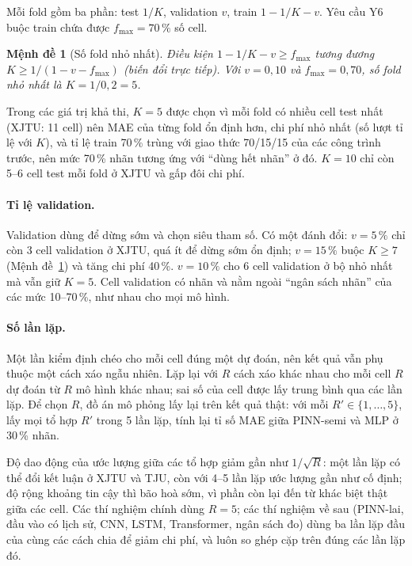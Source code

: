 \documentclass[12pt,a4paper,oneside]{report}
\theoremstyle{plain}
\newtheorem{menhde}{Mệnh đề}[chapter]
\theoremstyle{definition}
\begin{document}
Mỗi fold gồm ba phần: test $1/K$, validation $v$, train $1 - 1/K - v$. Yêu cầu Y6 buộc train chứa được
$f_{\max} = 70\,\%$ số cell.

\begin{menhde}[Số fold nhỏ nhất]\label{md:kmin}
Điều kiện $1 - 1/K - v \ge f_{\max}$ tương đương $K \ge 1/(1 - v - f_{\max})$ (biến đổi trực tiếp). Với $v = 0{,}10$
và $f_{\max} = 0{,}70$, số fold nhỏ nhất là $K = 1/0{,}2 = 5$.
\end{menhde}

Trong các giá trị khả thi, $K = 5$ được chọn vì mỗi fold có nhiều cell test nhất (XJTU: 11 cell) nên MAE của từng
fold ổn định hơn, chi phí nhỏ nhất (số lượt tỉ lệ với $K$), và tỉ lệ train 70\,\% trùng với giao thức 70/15/15 của
các công trình trước, nên mức 70\,\% nhãn tương ứng với “dùng hết nhãn” ở đó. $K = 10$ chỉ còn 5--6 cell test mỗi
fold ở XJTU và gấp đôi chi phí.



\paragraph{Tỉ lệ validation.} Validation dùng để dừng sớm và chọn siêu tham số. Có một đánh đổi: $v = 5\,\%$ chỉ còn 3 cell validation ở XJTU, quá ít để dừng sớm ổn định; $v = 15\,\%$ buộc $K \ge 7$
(Mệnh đề~\ref{md:kmin}) và tăng chi phí 40\,\%. $v = 10\,\%$ cho 6 cell validation ở bộ nhỏ nhất mà vẫn giữ $K = 5$.
Cell validation có nhãn và nằm ngoài “ngân sách nhãn” của các mức 10--70\,\%, như nhau cho mọi mô hình.



\paragraph{Số lần lặp.} Một lần kiểm định chéo cho mỗi cell đúng một dự đoán, nên kết quả vẫn phụ thuộc một cách xáo ngẫu nhiên. Lặp
lại với $R$ cách xáo khác nhau cho mỗi cell $R$ dự đoán từ $R$ mô hình khác nhau; sai số của cell được lấy
trung bình qua các lần lặp. Để chọn $R$, đồ án mô phỏng lấy lại trên kết quả thật: với mỗi $R' \in \{1, \dots, 5\}$,
lấy mọi tổ hợp $R'$ trong 5 lần lặp, tính lại tỉ số MAE giữa PINN-semi và MLP ở 30\,\% nhãn.




Độ dao động của ước lượng giữa các tổ hợp giảm gần như $1/\sqrt{R}$: một lần lặp có thể đổi kết luận ở XJTU và
TJU, còn với 4--5 lần lặp ước lượng gần như cố định; độ rộng khoảng tin cậy thì bão hoà sớm, vì phần còn lại đến từ
khác biệt thật giữa các cell. Các thí nghiệm chính dùng $R = 5$; các thí nghiệm về sau (PINN-lai, đầu vào có lịch sử,
CNN, LSTM, Transformer, ngân sách đo) dùng ba lần lặp đầu của cùng các cách chia để giảm chi phí, và luôn so ghép cặp
trên đúng các lần lặp đó.
\end{document}
